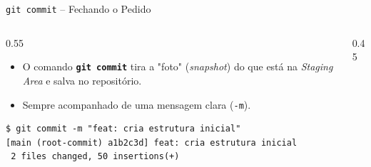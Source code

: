 \documentclass[aspectratio=169]{beamer}
\begin{document}
\begin{frame}[fragile]{\texttt{git commit} -- Fechando o Pedido}
    \begin{columns}
        \begin{column}{0.55\textwidth}
            \begin{itemize}
                \item O comando \textbf{\texttt{git commit}} tira a "foto" (\textit{snapshot}) do que está na \textit{Staging Area} e salva no repositório.
                \item Sempre acompanhado de uma mensagem clara (\texttt{-m}).
            \end{itemize}
\begin{lstlisting}[basicstyle=\ttfamily\tiny]
$ git commit -m "feat: cria estrutura inicial"
[main (root-commit) a1b2c3d] feat: cria estrutura inicial
 2 files changed, 50 insertions(+)
\end{lstlisting}
        \end{column}
        \begin{column}{0.45\textwidth}
            \begin{center}
            \end{center}
        \end{column}
    \end{columns}
\end{frame}
\end{document}
